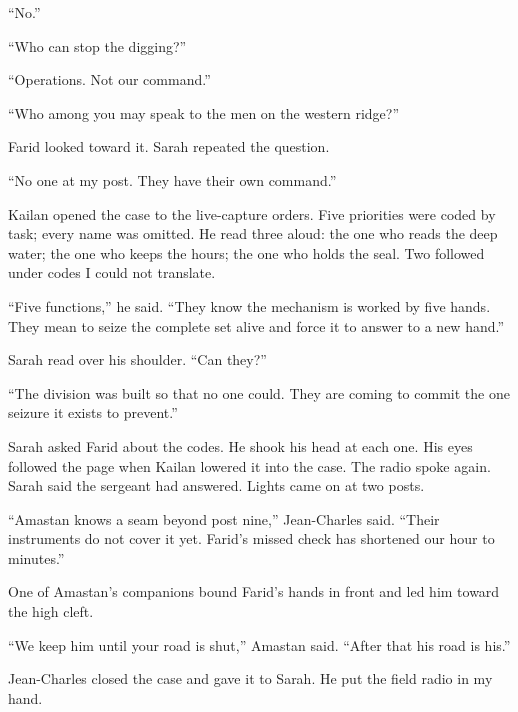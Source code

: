``No.''\par

``Who can stop the digging?''\par

``Operations. Not our command.''\par

``Who among you may speak to the men on the western ridge?''\par

Farid looked toward it. Sarah repeated the question.\par

``No one at my post. They have their own command.''\par

Kailan opened the case to the live-capture orders. Five priorities were coded by task; every name was omitted. He read three aloud: the one who reads the deep water; the one who keeps the hours; the one who holds the seal. Two followed under codes I could not translate.\par

``Five functions,'' he said. ``They know the mechanism is worked by five hands. They mean to seize the complete set alive and force it to answer to a new hand.''\par

Sarah read over his shoulder. ``Can they?''\par

``The division was built so that no one could. They are coming to commit the one seizure it exists to prevent.''\par

Sarah asked Farid about the codes. He shook his head at each one. His eyes followed the page when Kailan lowered it into the case. The radio spoke again. Sarah said the sergeant had answered. Lights came on at two posts.\par

``Amastan knows a seam beyond post nine,'' Jean-Charles said. ``Their instruments do not cover it yet. Farid's missed check has shortened our hour to minutes.''\par

One of Amastan's companions bound Farid's hands in front and led him toward the high cleft.\par

``We keep him until your road is shut,'' Amastan said. ``After that his road is his.''\par

Jean-Charles closed the case and gave it to Sarah. He put the field radio in my hand.\par

